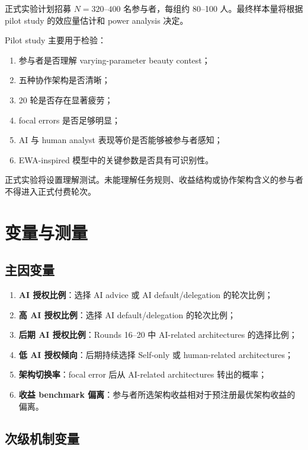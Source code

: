 \documentclass[12pt]{article}
\begin{document}
正式实验计划招募 $N = 320$–$400$ 名参与者，每组约 80–100 人。最终样本量将根据 pilot study 的效应量估计和 power analysis 决定。

Pilot study 主要用于检验：
\begin{enumerate}[label=\arabic*.]
    \item 参与者是否理解 varying-parameter beauty contest；
    \item 五种协作架构是否清晰；
    \item 20 轮是否存在显著疲劳；
    \item focal errors 是否足够明显；
    \item AI 与 human analyst 表现等价是否能够被参与者感知；
    \item EWA-inspired 模型中的关键参数是否具有可识别性。
\end{enumerate}

正式实验将设置理解测试。未能理解任务规则、收益结构或协作架构含义的参与者不得进入正式付费轮次。

\section{变量与测量}

\subsection{主因变量}
\begin{enumerate}[label=\arabic*.]
    \item \textbf{AI 授权比例}：选择 AI advice 或 AI default/delegation 的轮次比例；
    \item \textbf{高 AI 授权比例}：选择 AI default/delegation 的轮次比例；
    \item \textbf{后期 AI 授权比例}：Rounds 16--20 中 AI-related architectures 的选择比例；
    \item \textbf{低 AI 授权倾向}：后期持续选择 Self-only 或 human-related architectures；
    \item \textbf{架构切换率}：focal error 后从 AI-related architectures 转出的概率；
    \item \textbf{收益 benchmark 偏离}：参与者所选架构收益相对于预注册最优架构收益的偏离。
\end{enumerate}

\subsection{次级机制变量}
\end{document}
